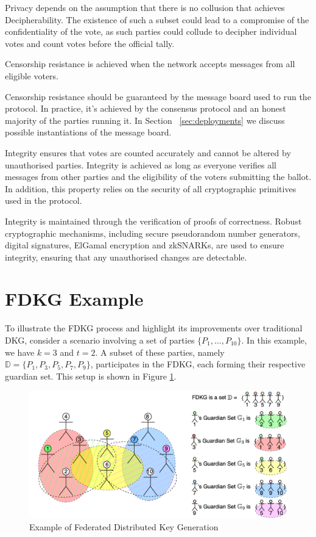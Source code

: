 \documentclass[runningheads]{llncs}
\begin{document}
Privacy depends on the assumption that there is no collusion that achieves Decipherability. The existence of such a subset could lead to a compromise of the confidentiality of the vote, as such parties could collude to decipher individual votes and count votes before the official tally.

\begin{definition}
    Censorship resistance is achieved when the network accepts messages from all eligible voters.
\end{definition}

Censorship resistance should be guaranteed by the message board used to run the protocol. In practice, it's achieved by the consensus protocol and an honest majority of the parties running it. In Section ~\ref{sec:deployments} we discuss possible instantiations of the message board.

\begin{definition}[Integrity]
    Integrity ensures that votes are counted accurately and cannot be altered by unauthorised parties. Integrity is achieved as long as everyone verifies all messages from other parties and the eligibility of the voters submitting the ballot. In addition, this property relies on the security of all cryptographic primitives used in the protocol.
\end{definition}

Integrity is maintained through the verification of proofs of correctness. Robust cryptographic mechanisms, including secure pseudorandom number generators, digital signatures, ElGamal encryption and zkSNARKs, are used to ensure integrity, ensuring that any unauthorised changes are detectable.

\section{FDKG Example}

To illustrate the FDKG process and highlight its improvements over traditional DKG, consider a scenario involving a set of parties $\{P_1, \ldots, P_{10}\}$. In this example, we have $k = 3$ and $t = 2$. A subset of these parties, namely $\mathbb{D} = \{P_1, P_3, P_5, P_7, P_9\}$, participates in the FDKG, each forming their respective guardian set. This setup is shown in Figure \ref{fig:FDKG}.

\begin{figure}
    \centering
    \includegraphics[width=.75\textwidth]{FDKG.png}
    \caption{Example of Federated Distributed Key Generation}
    \label{fig:FDKG}
\end{figure}
\end{document}
